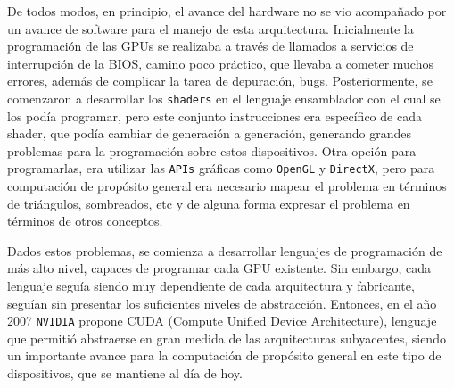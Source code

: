 De todos modos, en principio, el avance del hardware no se vio acompañado por un avance de software para el manejo de esta arquitectura.
Inicialmente la programación de las GPUs se realizaba a través de llamados a servicios de interrupción de la BIOS, camino poco práctico, que llevaba a cometer muchos errores, además de complicar la tarea de depuración, bugs.
Posteriormente, se comenzaron a desarrollar los \texttt{shaders} en el lenguaje ensamblador con el cual se los podía programar, pero este conjunto instrucciones era específico de cada shader, que podía cambiar de generación a generación, generando grandes problemas para la programación sobre estos dispositivos.
Otra opción para programarlas, era utilizar las \texttt{APIs} gráficas como \texttt{OpenGL} y \texttt{DirectX}, pero para computación de propósito general era necesario mapear el problema en términos de triángulos, sombreados, etc y de alguna forma expresar el problema en términos de  otros conceptos.

Dados estos problemas, se comienza a desarrollar lenguajes de programación de más alto nivel, capaces de programar cada GPU existente. Sin embargo, cada lenguaje seguía siendo muy dependiente de cada arquitectura y fabricante, seguían sin presentar los suficientes niveles de abstracción.
Entonces, en el año 2007 \texttt{NVIDIA} propone CUDA (Compute Unified Device Architecture), lenguaje que permitió abstraerse en gran medida de las arquitecturas subyacentes, siendo un importante avance para la computación de propósito general en este tipo de dispositivos, que se mantiene al día de hoy.

